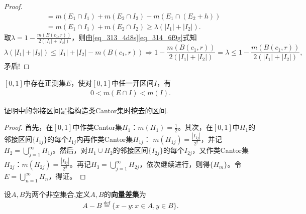 \documentclass[../../main.tex]{subfiles}%
\begin{document}
\begin{proof}
\begin{align}
&= m\left( E_1\cap I_1 \right) +m\left( E_2\cap I_2 \right) -m\left( E_1\cap \left( E_2+h \right) \right) \nonumber\\
&= m\left( E_1\cap I_1 \right) +m\left( E_2\cap I_2 \right)
\geqslant \lambda \left( \left| I_1 \right|+\left| I_2 \right| \right).
\end{align}
取$\lambda =1-\frac{m\left( B\left( c_1,r \right) \right)}{2\left( \left| I_1 \right|+\left| I_2 \right| \right)}$，则由\eqref{eq_313_4d8s}\eqref{eq_314_6f9g}式知
$$\lambda \left( \left| I_1 \right|+\left| I_2 \right| \right) \leqslant \left| I_1 \right|+\left| I_2 \right|-m\left( B\left( c_1,r \right) \right)
\Longrightarrow 1-\frac{m\left( B\left( c_1,r \right) \right)}{2\left( \left| I_1 \right|+\left| I_2 \right| \right)}=\lambda \leqslant 1-\frac{m\left( B\left( c_1,r \right) \right)}{2\left( \left| I_1 \right|+\left| I_2 \right| \right)},$$
矛盾!
\end{proof}


\begin{proposition}\label{proposition:正测集与区间交测度小于区间}
\([0,1]\)中存在正测集\(E\)，使对\([0,1]\)中任一开区间\(I\)，有
\begin{align*}
0 < m(E\cap I) < m(I).
\end{align*}
\end{proposition}
\begin{remark}
证明中的邻接区间是指构造类Cantor集时挖去的区间.
\end{remark}
\begin{proof}

首先，在\([0,1]\)中作类Cantor集\(H_1\)：\(m(H_1)=\frac{1}{2}\)。其次，在\([0,1]\)中\(H_1\)的邻接区间\(\{I_{1j}\}\)的每个\(I_{1j}\)内再作类Cantor集\(H_{1j}\)：
\(m(H_{1j}) = \frac{|I_{1j}|}{2^2}\)，并记\(H_2 = \bigcup_{j = 1}^{\infty}H_{1j}\)。然后，对\(H_1\cup H_2\)的邻接区间\(\{I_{2j}\}\)的每个\(I_{2j}\)，又作类Cantor集\(H_{2j}\)：\(m(H_{2j}) =\frac{|I_{2j}|}{2^3}\)。再记\(H_3 = \bigcup_{j = 1}^{\infty}H_{2j}\)，依次继续进行，则得\(\{H_m\}\)。令\(E = \bigcup_{n = 1}^{\infty}H_n\)，得证。 

\end{proof}

\begin{definition}[向量差集]\label{definition:向量差集}
设$A,B$为两个非空集合,定义$A,B$的\textbf{向量差集}为
\begin{align*}
A - B \stackrel{\text{def}}{=} \{x - y: x\in A,y \in B\}.
\end{align*}
\end{definition}
\end{document}
